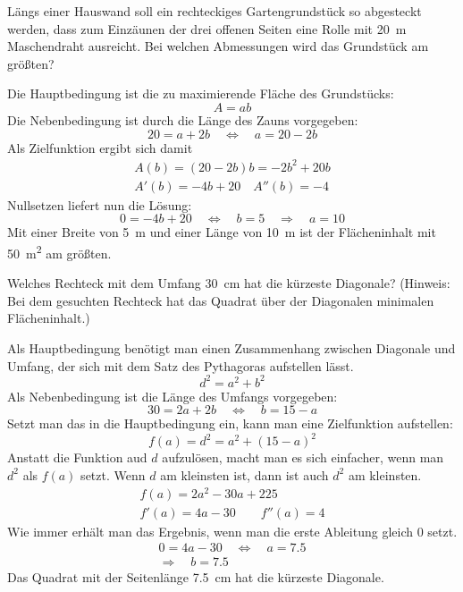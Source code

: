 \documentclass[auto-toc=false,babel=ngerman]{arbeitsblatt}
\begin{document}
\begin{question}
  Längs einer Hauswand soll ein rechteckiges Gartengrundstück so abgesteckt
  werden, dass zum Einzäunen der drei offenen Seiten eine Rolle mit
  \SI{20}{\metre} Maschendraht ausreicht.  Bei welchen Abmessungen wird das
  Grundstück am größten?
\end{question}
\begin{solution}
  Die Hauptbedingung ist die zu maximierende Fläche des Grundstücks:
  \[ A = ab \]
  Die Nebenbedingung ist durch die Länge des Zauns vorgegeben:
  \[ 20 = a+2b \quad\Leftrightarrow\quad a =20-2b \]
  Als Zielfunktion ergibt sich damit
  \begin{gather*}
    A(b)   = (20-2b)b = -2b^2+20b \\
    A'(b)  = -4b+20 \quad
    A''(b) = -4
  \end{gather*}
  Nullsetzen liefert nun die Lösung:
  \[
    0 = -4b+20 \quad \Leftrightarrow \quad
    b = 5 \quad\Rightarrow\quad
    a = 10
  \]
  Mit einer Breite von \SI{5}{\metre} und einer Länge von \SI{10}{\metre} ist
  der Flächeninhalt mit \SI{50}{\metre\squared} am größten.
\end{solution}

\begin{question}
  Welches Rechteck mit dem Umfang \SI{30}{\centi\metre} hat die kürzeste
  Diagonale?  (Hinweis: Bei dem gesuchten Rechteck hat das Quadrat über der
  Diagonalen minimalen Flächeninhalt.)
\end{question}

\begin{solution}
  Als Hauptbedingung benötigt man einen Zusammenhang zwischen Diagonale und
  Umfang, der sich mit dem Satz des Pythagoras aufstellen lässt.
  \[ d^2 = a^2+b^2 \]
  Als Nebenbedingung ist die Länge des Umfangs vorgegeben:
  \[
    30 = 2a+2b \quad \Leftrightarrow \quad b =15-a
  \]
  Setzt man das in die Hauptbedingung ein, kann man eine Zielfunktion
  aufstellen:
  \[ f(a) = d^2 = a^2 + (15-a)^2 \]
  Anstatt die Funktion aud $d$ aufzulösen, macht man es sich einfacher, wenn
  man $d^2$ als $f(a)$ setzt.  Wenn $d$ am kleinsten ist, dann ist auch $d^2$
  am kleinsten.
  \begin{gather*}
    f(a)   = 2a^2 - 30a + 225 \\
    f'(a)  = 4a-30 \qquad
    f''(a) = 4
  \end{gather*}
  Wie immer erhält man das Ergebnis, wenn man die erste Ableitung gleich $0$
  setzt.
  \begin{gather*}
    0 = 4a-30 \quad \Leftrightarrow \quad
    a = 7.5 \\
    \Rightarrow\quad b = 7.5
  \end{gather*}
  Das Quadrat mit der Seitenlänge \SI{7.5}{\centi\metre} hat die kürzeste
  Diagonale.
\end{solution}
\end{document}
